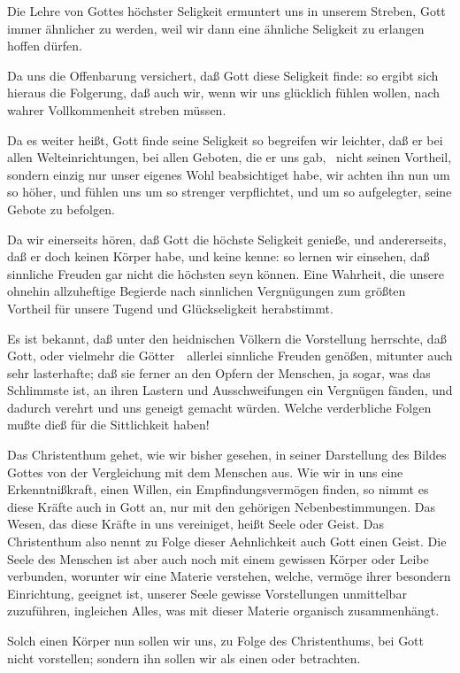 \begin{aufza}
\item Die Lehre von Gottes höchster Seligkeit ermuntert uns in unserem Streben, Gott immer ähnlicher zu werden, weil wir dann eine ähnliche Seligkeit zu erlangen hoffen dürfen.
\item Da uns die Offenbarung versichert, daß Gott diese Seligkeit  finde: so ergibt sich hieraus die Folgerung, daß auch wir, wenn wir uns glücklich fühlen wollen, nach wahrer Vollkommenheit streben müssen.
\item Da es weiter heißt, Gott finde seine Seligkeit  so begreifen wir leichter, daß er bei allen Welteinrichtungen, bei allen Geboten, die er uns gab, \usw\, nicht seinen Vortheil, sondern einzig nur unser eigenes Wohl beabsichtiget habe, wir achten ihn nun um so höher, und fühlen uns um so strenger verpflichtet, und um so aufgelegter, seine Gebote zu befolgen.
\item Da wir einerseits hören, daß Gott die höchste Seligkeit genieße, und andererseits, daß er doch keinen Körper habe, und keine  kenne: so lernen wir einsehen, daß sinnliche Freuden gar nicht die höchsten seyn können. Eine Wahrheit, die unsere ohnehin allzuheftige Begierde nach sinnlichen Vergnügungen zum größten Vortheil für unsere Tugend und Glückseligkeit herabstimmt.
\end{aufza}

Es ist bekannt, daß unter den heidnischen Völkern die Vorstellung herrschte, daß Gott, oder vielmehr die Götter~\ allerlei sinnliche Freuden genößen, mitunter auch sehr lasterhafte; daß sie ferner an den Opfern der Menschen, ja sogar, was das Schlimmste ist, an ihren Lastern und Ausschweifungen ein Vergnügen fänden, und dadurch verehrt und uns geneigt gemacht würden. Welche verderbliche Folgen mußte dieß für die Sittlichkeit haben!

Das Christenthum gehet, wie wir bisher gesehen, in seiner Darstellung des Bildes Gottes von der Vergleichung mit dem Menschen aus. Wie wir in uns eine Erkenntnißkraft, einen Willen, ein Empfindungsvermögen finden, so nimmt es diese Kräfte auch in Gott an, nur mit den gehörigen Nebenbestimmungen. Das Wesen, das diese Kräfte in uns vereiniget, heißt Seele oder Geist. Das Christenthum also nennt zu Folge dieser Aehnlichkeit auch Gott einen Geist. Die Seele des Menschen ist aber auch noch mit einem gewissen Körper oder Leibe verbunden, worunter wir eine Materie verstehen, welche, vermöge ihrer besondern Einrichtung, geeignet ist, unserer Seele gewisse Vorstellungen unmittelbar zuzuführen, ingleichen Alles, was mit dieser Materie organisch zusammenhängt.\par		
Solch einen Körper nun sollen wir uns, zu Folge des Christenthums, bei Gott nicht vorstellen; sondern ihn sollen wir als einen  oder  betrachten.

